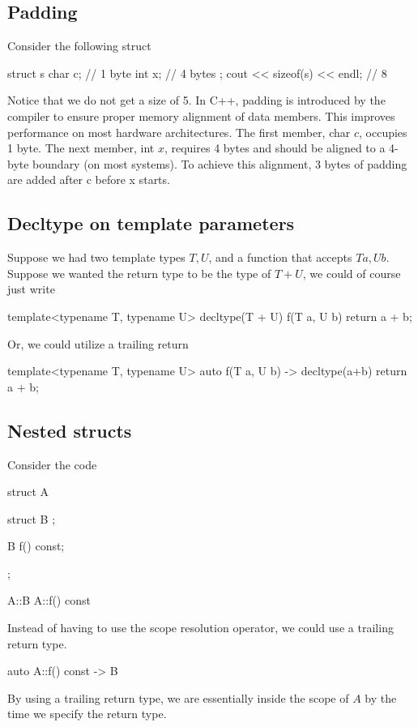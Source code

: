 \documentclass{report}
\begin{document}
    \bigbreak \noindent 
    \subsection{Padding}
    \bigbreak \noindent 
    Consider the following struct
    \bigbreak \noindent 
    \begin{cppcode}
        struct s {
            char c; // 1 byte
            int x; // 4 bytes
        };
        cout << sizeof(s) << endl; // 8
    \end{cppcode}
    \bigbreak \noindent 
    Notice that we do not get a size of 5. In C++, padding is introduced by the compiler to ensure proper memory alignment of data members. This improves performance on most hardware architectures. The first member, char $c$, occupies 1 byte. The next member, int $x$, requires 4 bytes and should be aligned to a 4-byte boundary (on most systems). To achieve this alignment, 3 bytes of padding are added after c before x starts.

    \pagebreak 
    \bigbreak \noindent 
    \subsection{Decltype on template parameters}
    \bigbreak \noindent 
    Suppose we had two template types $T,U$, and a function that accepts $T a, U b$. Suppose we wanted the return type to be the type of $T + U$, we could of course just write
    \bigbreak \noindent 
    \begin{cppcode}
        template<typename T, typename U>
        decltype(T{} + U{}) f(T a, U b) {
            return a + b; 
        }
    \end{cppcode}
    \bigbreak \noindent 
    Or, we could utilize a trailing return
    \bigbreak \noindent 
    \begin{cppcode}
    template<typename T, typename U>
    auto f(T a, U b) -> decltype(a+b) {
        return a + b; 
    }
    \end{cppcode}
    \bigbreak \noindent 
    \subsection{Nested structs}
    \bigbreak \noindent 
    Consider the code
    \bigbreak \noindent 
    \begin{cppcode}
        struct A {
            struct B {};

            B f() const;
        };

        A::B A::f() const { }
    \end{cppcode}
    \bigbreak \noindent 
    Instead of having to use the scope resolution operator, we could use a trailing return type.
    \bigbreak \noindent 
    \begin{cppcode}
        auto A::f() const -> B {

        }
    \end{cppcode}
    \bigbreak \noindent 
    By using a trailing return type, we are essentially inside the scope of $A$ by the time we specify the return type.
\end{document}

